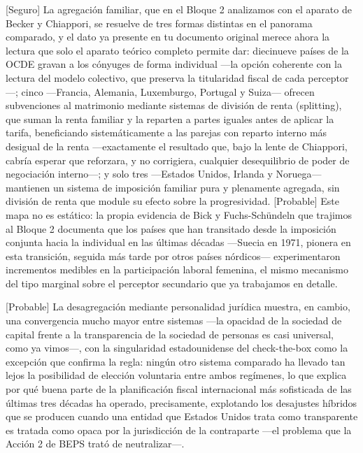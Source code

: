 \documentclass[10pt,a4paper]{article}
\begin{document}
[Seguro] La agregación familiar, que en el Bloque 2 analizamos con el aparato de Becker y Chiappori, se resuelve de tres formas distintas en el panorama comparado, y el dato ya presente en tu documento original merece ahora la lectura que solo el aparato teórico completo permite dar: diecinueve países de la OCDE gravan a los cónyuges de forma individual —la opción coherente con la lectura del modelo colectivo, que preserva la titularidad fiscal de cada perceptor—; cinco —Francia, Alemania, Luxemburgo, Portugal y Suiza— ofrecen subvenciones al matrimonio mediante sistemas de división de renta (splitting), que suman la renta familiar y la reparten a partes iguales antes de aplicar la tarifa, beneficiando sistemáticamente a las parejas con reparto interno más desigual de la renta —exactamente el resultado que, bajo la lente de Chiappori, cabría esperar que reforzara, y no corrigiera, cualquier desequilibrio de poder de negociación interno—; y solo tres —Estados Unidos, Irlanda y Noruega— mantienen un sistema de imposición familiar pura y plenamente agregada, sin división de renta que module su efecto sobre la progresividad. [Probable] Este mapa no es estático: la propia evidencia de Bick y Fuchs-Schündeln que trajimos al Bloque 2 documenta que los países que han transitado desde la imposición conjunta hacia la individual en las últimas décadas —Suecia en 1971, pionera en esta transición, seguida más tarde por otros países nórdicos— experimentaron incrementos medibles en la participación laboral femenina, el mismo mecanismo del tipo marginal sobre el perceptor secundario que ya trabajamos en detalle.

[Probable] La desagregación mediante personalidad jurídica muestra, en cambio, una convergencia mucho mayor entre sistemas —la opacidad de la sociedad de capital frente a la transparencia de la sociedad de personas es casi universal, como ya vimos—, con la singularidad estadounidense del check-the-box como la excepción que confirma la regla: ningún otro sistema comparado ha llevado tan lejos la posibilidad de elección voluntaria entre ambos regímenes, lo que explica por qué buena parte de la planificación fiscal internacional más sofisticada de las últimas tres décadas ha operado, precisamente, explotando los desajustes híbridos que se producen cuando una entidad que Estados Unidos trata como transparente es tratada como opaca por la jurisdicción de la contraparte —el problema que la Acción 2 de BEPS trató de neutralizar—.
\end{document}
